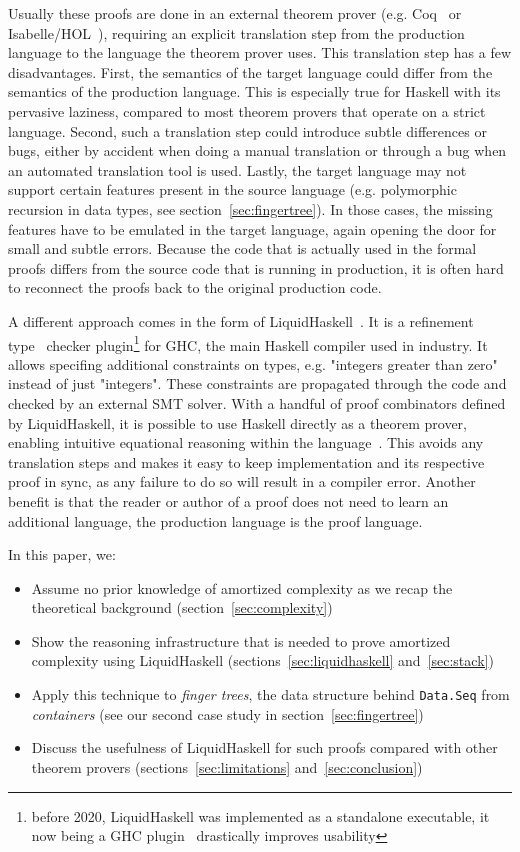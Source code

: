 \documentclass[sigplan,screen,review,anonymous]{acmart}
\begin{document}
Usually these proofs are done in an external theorem prover (e.g. Coq~\cite{complexity_coq} or Isabelle/HOL~\cite{complexity_isabelle}), requiring an explicit translation step from the production language to the language the theorem prover uses. This translation step has a few disadvantages. First, the semantics of the target language could differ from the semantics of the production language. This is especially true for Haskell with its pervasive laziness, compared to most theorem provers that operate on a strict language. Second, such a translation step could introduce subtle differences or bugs, either by accident when doing a manual translation or through a bug when an automated translation tool is used. Lastly, the target language may not support certain features present in the source language (e.g. polymorphic recursion in data types, see section~\ref{sec:fingertree}). In those cases, the missing features have to be emulated in the target language, again opening the door for small and subtle errors. Because the code that is actually used in the formal proofs differs from the source code that is running in production, it is often hard to reconnect the proofs back to the original production code.

A different approach comes in the form of LiquidHaskell~\cite{liquidhaskell}. It is a refinement type~\cite{refinement_types} checker plugin\footnote{before 2020, LiquidHaskell was implemented as a standalone executable, it now being a GHC plugin~\cite{lh_plugin} drastically improves usability} for GHC, the main Haskell compiler used in industry. It allows specifing additional constraints on types, e.g. "integers greater than zero" instead of just "integers". These constraints are propagated through the code and checked by an external SMT solver. With a handful of proof combinators defined by LiquidHaskell, it is possible to use Haskell directly as a theorem prover, enabling intuitive equational reasoning within the language~\cite{tpfa}. This avoids any translation steps and makes it easy to keep implementation and its respective proof in sync, as any failure to do so will result in a compiler error. Another benefit is that the reader or author of a proof does not need to learn an additional language, the production language is the proof language.

In this paper, we:
\begin{itemize}
\item{Assume no prior knowledge of amortized complexity as we recap the theoretical background (section~\ref{sec:complexity})}
\item{Show the reasoning infrastructure that is needed to prove amortized complexity using LiquidHaskell (sections~\ref{sec:liquidhaskell} and~\ref{sec:stack})}
\item{Apply this technique to \textit{finger trees}, the data structure behind \texttt{Data.Seq} from \textit{containers} (see our second case study in section~\ref{sec:fingertree})}
\item{Discuss the usefulness of LiquidHaskell for such proofs compared with other theorem provers (sections~\ref{sec:limitations} and~\ref{sec:conclusion})}
\end{itemize}
\end{document}
